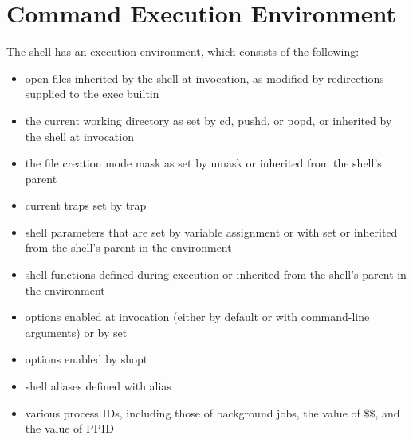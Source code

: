 \section{Command Execution Environment}\label{sec:commandexecutionenvironment}
The shell has an execution environment, which consists of the following:

\begin{itemize}
    \item  open files inherited by the shell at invocation, as modified by redirections supplied to the exec builtin
    \item  the current working directory as set by cd, pushd, or popd, or inherited by the shell at invocation
    \item  the file creation mode mask as set by umask or inherited from the shell's parent
    \item  current traps set by trap
    \item  shell parameters that are set by variable assignment or with set or inherited from the shell's parent in the environment
    \item  shell functions defined during execution or inherited from the shell's parent in the environment
    \item  options enabled at invocation (either by default or with command-line arguments) or by set
    \item  options enabled by shopt
    \item  shell aliases defined with alias
    \item  various process IDs, including those of background jobs, the value of \$\$, and the value of PPID
\end{itemize}

